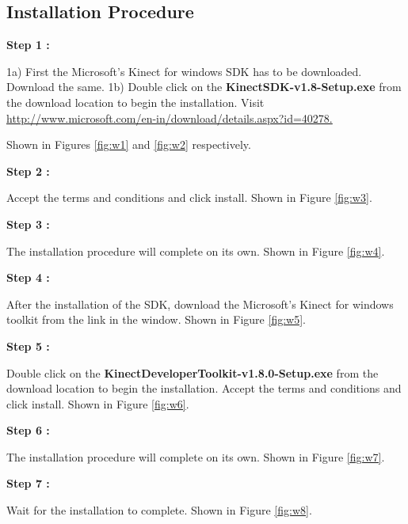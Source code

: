 \begin{flushleft}
\subsection{\textbf{ Installation Procedure}}

\textbf{Step 1 :}

\medskip
1a) First the Microsoft's Kinect for windows SDK has to be downloaded. Download the same.
1b) Double click on the \textbf{KinectSDK-v1.8-Setup.exe} from the download location to begin the installation.  
Visit \url{ http://www.microsoft.com/en-in/download/details.aspx?id=40278.}

Shown in Figures \ref{fig:w1} and \ref{fig:w2} respectively.

\medskip
\textbf{Step 2 :}

\medskip
Accept the terms and conditions and click install.
Shown in Figure \ref{fig:w3}.

\medskip

\textbf{Step 3 :}

\medskip
The installation procedure will complete on its own.
Shown in Figure \ref{fig:w4}.

\medskip

\textbf{Step 4 :}

\medskip

After the installation of the SDK, download the Microsoft's Kinect for windows toolkit from the link in the window.
Shown in Figure \ref{fig:w5}.

\medskip

\textbf{Step 5 :}

\medskip

Double click on the \textbf{KinectDeveloperToolkit-v1.8.0-Setup.exe} from the download location to begin the installation. Accept the terms and conditions and click install.
Shown in Figure \ref{fig:w6}.
 
\medskip

\textbf{Step 6 :}

\medskip

The installation procedure will complete on its own.
Shown in Figure \ref{fig:w7}.

\medskip

\textbf{Step 7 :}

\medskip

Wait for the installation to complete.
Shown in Figure \ref{fig:w8}.

\medskip


\end{flushleft}
